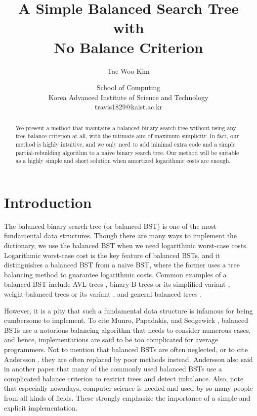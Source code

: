 \documentclass{article}
\begin{document}
\title{A Simple Balanced Search Tree with\\
No Balance Criterion}

\author{Tae Woo Kim}
\date{
School of Computing\\
Korea Advanced Institute of Science and Technology\\
travis1829@kaist.ac.kr
}

\maketitle

\begin{abstract}
We present a method that maintains a balanced binary search tree without using any tree balance criterion at all, with the ultimate aim of maximum simplicity. In fact, our method is highly intuitive, and we only need to add minimal extra code and a simple partial-rebuilding algorithm to a naive binary search tree. Our method will be suitable as a highly simple and short solution when amortized logarithmic costs are enough.
\end{abstract}

\section{Introduction}

The balanced binary search tree (or balanced BST) is one of the most fundamental data structures. Though there are many ways to implement the dictionary, we use the balanced BST when we need logarithmic worst-case costs. Logarithmic worst-case cost is the key feature of balanced BSTs, and it distinguishes a balanced BST from a naive BST, where the former uses a tree balancing method to guarantee logarithmic costs. Common examples of a balanced BST include AVL trees \cite{Adelson-VelskyAVL}, binary B-trees \cite{BayerBB} or its simplified variant \cite{AnderssonAA}, weight-balanced trees \cite{NievergeltWB} or its variant \cite{Overmars:1987:DDD:535500}, and general balanced trees \cite{AnderssonGBT}.

However, it is a pity that such a fundamental data structure is infamous for being cumbersome to implement. To cite Munro, Papadakis, and Sedgewick \cite{MunroDSL}, balanced BSTs use a notorious balancing algorithm that needs to consider numerous cases, and hence, implementations are said to be too complicated for average programmers. Not to mention that balanced BSTs are often neglected, or to cite Andersson \cite{AnderssonAA}, they are often replaced by poor methods instead. Andersson \cite{AnderssonGBT} also said in another paper that many of the commonly used balanced BSTs use a complicated balance criterion to restrict trees and detect imbalance. Also, note that especially nowadays, computer science is needed and used by so many people from all kinds of fields. These strongly emphasize the importance of a simple and explicit implementation.
\end{document}
